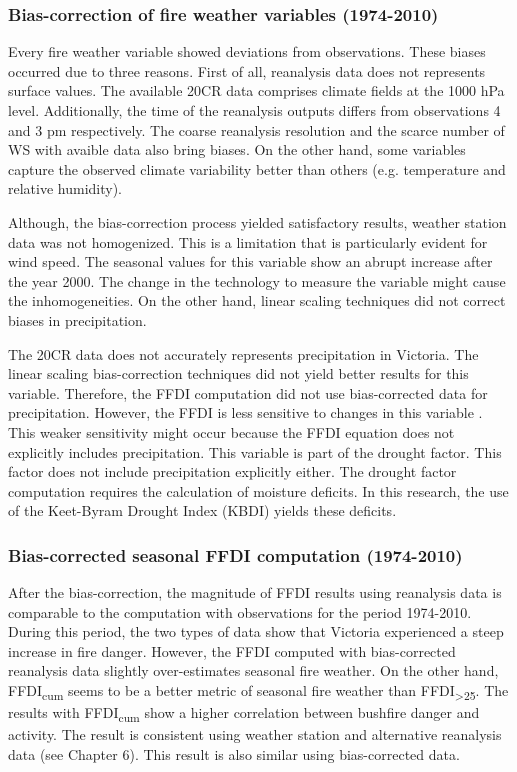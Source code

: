 \subsubsection{Bias-correction of fire weather variables (1974-2010)}

Every fire weather variable showed deviations from observations. These
biases occurred due to three reasons. First of all, reanalysis data
does not represents surface values. The available 20CR data comprises
climate fields at the 1000 hPa level. Additionally, the time of the
reanalysis outputs differs from observations\textemdash{} 4 and 3
pm respectively\textemdash . The coarse reanalysis resolution and
the scarce number of WS with avaible data also bring biases. On the
other hand, some variables capture the observed climate variability
better than others (e.g. temperature and relative humidity). 

Although, the bias-correction process yielded satisfactory results,
weather station data was not homogenized. This is a limitation that
is particularly evident for wind speed. The seasonal values for this
variable show an abrupt increase after the year 2000. The change in
the technology to measure the variable might cause the inhomogeneities.
On the other hand, linear scaling techniques did not correct biases
in precipitation. 

The 20CR data does not accurately represents precipitation in Victoria.
The linear scaling bias-correction techniques did not yield better
results for this variable. Therefore, the FFDI computation did not
use bias-corrected data for precipitation. However, the FFDI is less
sensitive to changes in this variable \citep{Dowdy2009a}. This weaker
sensitivity might occur because the FFDI equation does not explicitly
includes precipitation. This variable is part of the drought factor.
This factor does not include precipitation explicitly either. The
drought factor computation requires the calculation of moisture deficits.
In this research, the use of the Keet-Byram Drought Index (KBDI) \citep{KeetchJJ}
yields these deficits.


\subsubsection{Bias-corrected seasonal FFDI computation (1974-2010)}

After the bias-correction, the magnitude of FFDI results using reanalysis
data is comparable to the computation with observations for the period
1974-2010. During this period, the two types of data show that Victoria
experienced a steep increase in fire danger. However, the FFDI computed
with bias-corrected reanalysis data slightly over-estimates seasonal
fire weather. On the other hand, FFDI\textsubscript{cum} seems to
be a better metric of seasonal fire weather than FFDI\textsubscript{>25}.
The results with FFDI\textsubscript{cum} show a higher correlation
between bushfire danger and activity. The result is consistent using
weather station and alternative reanalysis data (see Chapter 6). This
result is also similar using bias-corrected data. 


